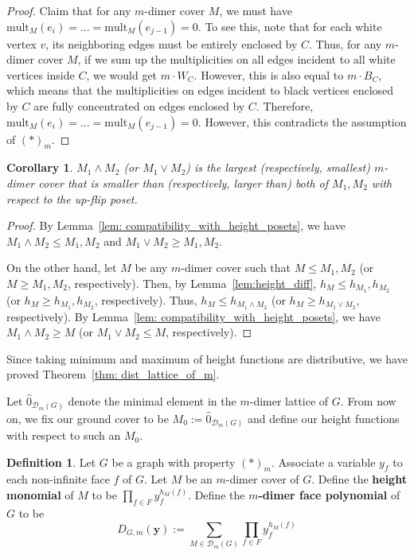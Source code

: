 \documentclass[11pt]{amsart}
\newtheorem{cor}[thm]{Corollary}
\theoremstyle{definition}
\newtheorem{defn}[thm]{Definition}
\theoremstyle{remark}
\numberwithin{equation}{section}
\begin{document}
\begin{proof}
    Claim that for any $m$-dimer cover $M$, we must have $\text{mult}_M(e_i) = ... = \text{mult}_M(e_{j-1}) = 0$. To see this, note that for each white vertex $v$, its neighboring edges must be entirely enclosed by $C$. Thus, for any $m$-dimer cover $M$, if we sum up the multiplicities on all edges incident to all white vertices inside $C$, we would get $m\cdot W_C$. However, this is also equal to $m\cdot B_C$, which means that the multiplicities on edges incident to black vertices enclosed by $C$ are fully concentrated on edges enclosed by $C$. Therefore, $\text{mult}_M(e_i) = ... = \text{mult}_M(e_{j-1}) = 0$. However, this contradicts the assumption of $(*)_m$. 
\end{proof}

\begin{cor}
    $M_1\wedge M_2$ (or $M_1\vee M_2$) is the largest (respectively, smallest) $m$-dimer cover that is smaller than (respectively, larger than) both of $M_1, M_2$ with respect to the up-flip poset.
\end{cor}
\begin{proof}
    By Lemma~\ref{lem: compatibility_with_height_posets}, we have $M_1\wedge M_2\leq M_1, M_2$ and $M_1\vee M_2\geq M_1, M_2$. 

    On the other hand, let $M$ be any $m$-dimer cover such that $M\leq M_1,M_2$ (or $M\geq M_1,M_2$, respectively). Then, by Lemma~\ref{lem:height_diff}, $h_M\leq h_{M_1}, h_{M_2}$ (or $h_M\geq h_{M_1}, h_{M_2}$, respectively). Thus, $h_M\leq h_{M_1\wedge M_2}$ (or $h_M\geq h_{M_1\vee M_2}$, respectively). By Lemma~\ref{lem: compatibility_with_height_posets}, we have $M_1\wedge M_2\geq M$ (or $M_1\vee M_2\leq M$, respectively).
\end{proof}

Since taking minimum and maximum of height functions are distributive, we have proved Theorem~\ref{thm: dist_lattice_of_m}. 

Let $\hat{0}_{\mathcal{D}_{m}(G)}$ denote the minimal element in the $m$-dimer lattice of $G$. From now on, we fix our ground cover to be $M_0 := \hat{0}_{\mathcal{D}_{m}(G)}$ and define our height functions with respect to such an $M_0$. 

\begin{defn}
    Let $G$ be a graph with property $(*)_m$. Associate a variable $y_f$ to each non-infinite face $f$ of $G$. Let $M$ be an $m$-dimer cover of $G$. Define the \textbf{height monomial} of $M$ to be $\displaystyle\prod_{f\in F}y^{h_M(f)}_f$. Define the \textbf{$m$-dimer face polynomial} of $G$ to be $$D_{G,m}(\mathbf{y}):= \sum_{M\in \mathcal{D}_m(G)}\displaystyle\prod_{f\in F}y^{h_M(f)}_f$$
\end{defn}
\end{document}

